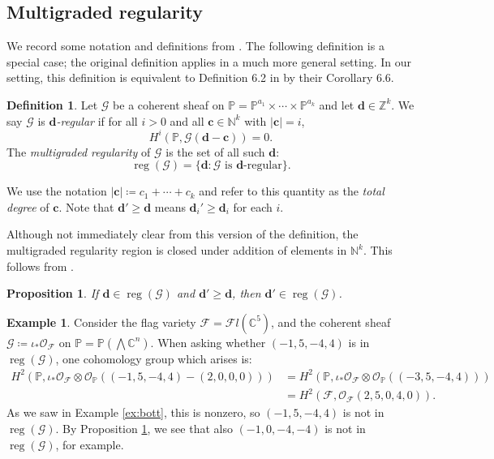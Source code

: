 \documentclass[12pt,reqno]{amsart}
\newtheorem{proposition}[theorem]{Proposition}
\theoremstyle{definition}
\newtheorem{definition}[theorem]{Definition}
\newtheorem{example}[theorem]{Example}
\theoremstyle{remark}
\newcommand{\reg}{\operatorname{reg}}
\newcommand{\calF}{{\mathcal{F}}}
\newcommand{\calG}{{\mathcal{G}}}
\newcommand{\calO}{{\mathcal{O}}}
\begin{document}
\subsection{Multigraded regularity}\label{subsec:regularityDefns}

We record some notation and definitions from \cite{MaclaganSmith2004}.
The following definition is a special case; the original definition applies in a much more general setting. In our setting, this definition is equivalent to Definition 6.2 in \cite{MaclaganSmith2004} by their Corollary 6.6.

\begin{definition}\label{defn:regSheaf}
Let $\calG$ be a coherent sheaf on $\mathbb P = \mathbb P^{a_1}\times\cdots\times\mathbb P^{a_k}$ and let $\mathbf d \in \mathbb Z^k$.  We say $\calG$ is \textit{$\mathbf d$-regular} if for all $i>0$ and all $\mathbf c \in \mathbb N^k$ with $\lvert \mathbf c \rvert = i$,
\[
H^i(\mathbb P, \calG(\mathbf d - \mathbf c)) = 0.
\]
The \textit{multigraded regularity} of $\calG$ is the set of all such $\mathbf d$:
\[
\reg(\calG) = \{\mathbf d: \calG \text{ is } \mathbf d\text{-regular}\}.
\]
\end{definition}

We use the notation $|\mathbf c| \coloneqq c_1+\cdots+c_k$ and refer to this quantity as the \textit{total degree} of $\mathbf c$.  Note that $\mathbf d' \geq \mathbf d$ means $\mathbf d_i' \geq \mathbf d_i$ for each $i$.

Although not immediately clear from this version of the definition, the multigraded regularity region is closed under addition of elements in $\mathbb N^k$.  This follows from \cite[Remark 6.3, Corollary 6.6]{MaclaganSmith2004}.

\begin{proposition}\label{prop:closedUnderPos} \cite[Rmk. 6.3, Cor. 6.6]{MaclaganSmith2004}
    If $\mathbf d \in \reg(\calG)$ and $\mathbf d' \geq \mathbf d$, then $\mathbf d' \in \reg(\calG)$.
\end{proposition}

\begin{example}
Consider the flag variety $\calF = \calF l(\mathbb C^5)$, and the coherent sheaf $\calG \coloneqq \iota_* \calO_{\calF}$ on $\mathbb P = \mathbb P\left(\bigwedge \mathbb C^n\right)$.  When asking whether $(-1,5,-4,4)$ is in $\reg(\calG)$, one cohomology group which arises is:
\begin{align*}
H^2(\mathbb P, \iota_*\calO_{\calF}\otimes\calO_{\mathbb P}((-1,5,-4,4)-(2,0,0,0))) &= H^2(\mathbb P, \iota_*\calO_{\calF}\otimes\calO_{\mathbb P}((-3,5,-4,4)))\\
&= H^2(\calF, \calO_{\calF}(2,5,0,4,0)).
\end{align*}
As we saw in Example \ref{ex:bott}, this is nonzero, so $(-1,5,-4,4)$ is not in $\reg(\calG)$.  By Proposition \ref{prop:closedUnderPos}, we see that also $(-1,0,-4,-4)$ is not in $\reg(\calG)$, for example.
\end{example}
\end{document}
